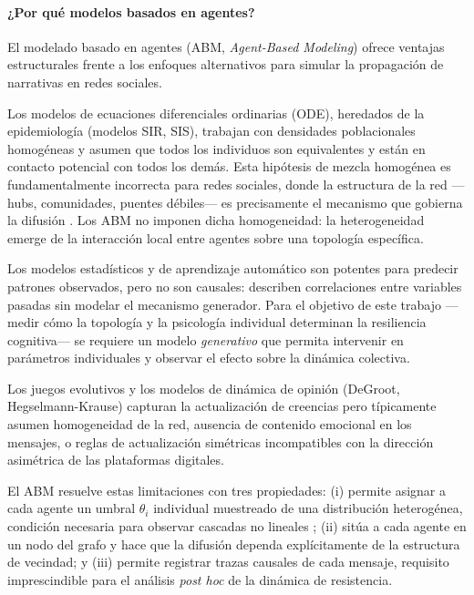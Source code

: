 \paragraph{¿Por qué modelos basados en agentes?}

El modelado basado en agentes (ABM, \emph{Agent-Based Modeling}) ofrece ventajas estructurales frente a los enfoques alternativos para simular la propagación de narrativas en redes sociales.

Los modelos de ecuaciones diferenciales ordinarias (ODE), heredados de la epidemiología (modelos SIR, SIS), trabajan con densidades poblacionales homogéneas y asumen que todos los individuos son equivalentes y están en contacto potencial con todos los demás. Esta hipótesis de mezcla homogénea es fundamentalmente incorrecta para redes sociales, donde la estructura de la red ---hubs, comunidades, puentes débiles--- es precisamente el mecanismo que gobierna la difusión \cite{Watts2002,CentolaMacy2007}. Los ABM no imponen dicha homogeneidad: la heterogeneidad emerge de la interacción local entre agentes sobre una topología específica.

Los modelos estadísticos y de aprendizaje automático son potentes para predecir patrones observados, pero no son causales: describen correlaciones entre variables pasadas sin modelar el mecanismo generador. Para el objetivo de este trabajo ---medir cómo la topología y la psicología individual determinan la resiliencia cognitiva--- se requiere un modelo \emph{generativo} que permita intervenir en parámetros individuales y observar el efecto sobre la dinámica colectiva.

Los juegos evolutivos y los modelos de dinámica de opinión (DeGroot, Hegselmann-Krause) capturan la actualización de creencias pero típicamente asumen homogeneidad de la red, ausencia de contenido emocional en los mensajes, o reglas de actualización simétricas incompatibles con la dirección asimétrica de las plataformas digitales.

El ABM resuelve estas limitaciones con tres propiedades: (i) permite asignar a cada agente un umbral $\theta_i$ individual muestreado de una distribución heterogénea, condición necesaria para observar cascadas no lineales \cite{Granovetter1978}; (ii) sitúa a cada agente en un nodo del grafo y hace que la difusión dependa explícitamente de la estructura de vecindad; y (iii) permite registrar trazas causales de cada mensaje, requisito imprescindible para el análisis \emph{post hoc} de la dinámica de resistencia.

